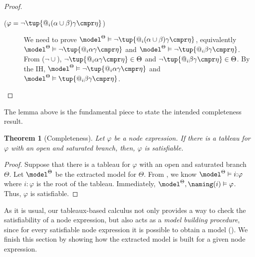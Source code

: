\documentclass[10pt,a4paper]{amsart}
\newtheorem{thm}{Theorem}[section]
\theoremstyle{definition}
\theoremstyle{remark}
\begin{document}
\begin{proof}
\begin{description}
\begin{description}
            \item[($\varphi = \lnot\tup{@_i(\alpha \cup \beta) \gamma \cmpr \eta}$)]
                We need to prove  $\model^\Theta \vDash \lnot\tup{@_i (\alpha \cup \beta) \gamma \cmpr \eta}$, equivalently $\model^\Theta \vDash \lnot\tup{@_i\alpha\gamma \cmpr \eta}$ and $\model^\Theta \vDash \lnot\tup{@_i \beta\gamma \cmpr \eta}$.
                From (${\lnot}{\cup}$), $\lnot\tup{@_i\alpha\gamma \cmpr \eta} \in \Theta$ and $\lnot\tup{@_i\beta\gamma \cmpr \eta} \in \Theta$.
                By the IH, $\model^{\Theta} \vDash \lnot\tup{@_i\alpha\gamma \cmpr \eta}$ and $\model^{\Theta} \vDash \tup{@_i\beta\gamma \cmpr \eta}$.
        \end{description}

    \end{description}
\end{proof}

The lemma above is the fundamental piece to state the intended completeness result.

\begin{thm}[Completeness]
    Let $\varphi$ be a node expression.
    If there is a tableau for $\varphi$ with an open and saturated branch, then, $\varphi$ is satisfiable.
\end{thm}
\begin{proof}
    Suppose that there is a tableau for $\varphi$ with an open and saturated branch $\Theta$.
    Let $\model^{\Theta}$ be the extracted model for $\Theta$.
    From , we know $\model^{\Theta} \vDash i{:}\varphi$ where $i{:}\varphi$ is the root of the tableau.
    Immediately, $\model^{\Theta}, \naming(i) \vDash \varphi$.
    Thus, $\varphi$ is satisfiable.
\end{proof}

As it is usual, our tableaux-based calculus not only provides a way to check the satisfiability of a node expression, but also acts as a \emph{model building procedure}, since for every satisfiable node expression it is possible to obtain a model (). 
We finish this section by showing how the extracted model is built for a given node expression.
\end{document}
